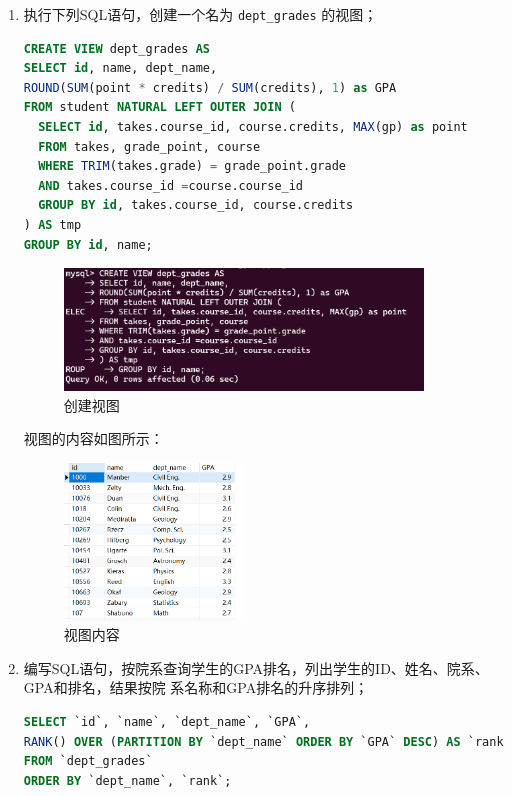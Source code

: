 \documentclass{article}
\renewcommand\tt{\texttt}
\begin{document}
\begin{enumerate}
\item 执行下列SQL语句，创建一个名为 \tt{dept\_grades} 的视图；

\begin{lstlisting}[language=sql]
CREATE VIEW dept_grades AS
SELECT id, name, dept_name, 
ROUND(SUM(point * credits) / SUM(credits), 1) as GPA
FROM student NATURAL LEFT OUTER JOIN (
  SELECT id, takes.course_id, course.credits, MAX(gp) as point
  FROM takes, grade_point, course
  WHERE TRIM(takes.grade) = grade_point.grade 
  AND takes.course_id =course.course_id
  GROUP BY id, takes.course_id, course.credits
) AS tmp
GROUP BY id, name;
\end{lstlisting}

\begin{figure}[H]
  \centering
  \includegraphics[width=0.9\textwidth]{img/33.png}
  \caption{创建视图}
\end{figure}

视图的内容如图所示：

\begin{figure}[H]
  \centering
  \includegraphics[width=0.45\textwidth]{img/34.png}
  \caption{视图内容}
\end{figure}

\item 编写SQL语句，按院系查询学生的GPA排名，列出学生的ID、姓名、院系、GPA和排名，结果按院
系名称和GPA排名的升序排列；

\begin{lstlisting}[language=sql]
SELECT `id`, `name`, `dept_name`, `GPA`, 
RANK() OVER (PARTITION BY `dept_name` ORDER BY `GPA` DESC) AS `rank`
FROM `dept_grades`
ORDER BY `dept_name`, `rank`;
\end{lstlisting}


\end{enumerate}
\end{document}

